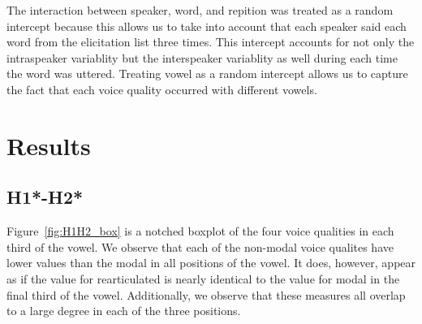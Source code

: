 \documentclass[12pt, letterpaper]{article}
\begin{document}
The interaction between speaker, word, and repition was treated as a random intercept because this allows us to take into account that each speaker said each word from the elicitation list three times. This intercept accounts for not only the intraspeaker variablity but the interspeaker variablity as well during each time the word was uttered. Treating vowel as a random intercept allows us to capture the fact that each voice quality occurred with different vowels.

\section{Results} \label{sec:Results}



\subsection{H1*-H2*} \label{sec:H1H2}

Figure~\ref{fig:H1H2_box} is a notched boxplot of the four voice qualities in each third of the vowel. We observe that each of the non-modal voice qualites have lower values than the modal in all positions of the vowel. It does, however, appear as if the value for rearticulated is nearly identical to the value for modal in the final third of the vowel. Additionally, we observe that these measures all overlap to a large degree in each of the three positions. 
\end{document}

